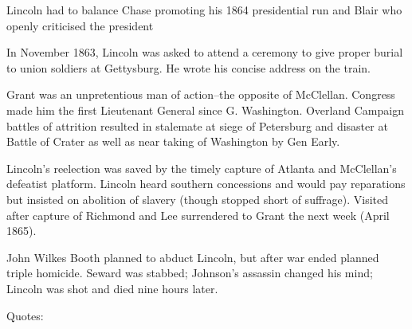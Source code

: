 \documentclass[
]{article}
\begin{document}
Lincoln had to balance Chase promoting his 1864 presidential run and
Blair who openly criticised the president

In November 1863, Lincoln was asked to attend a ceremony to give proper
burial to union soldiers at Gettysburg. He wrote his concise address on
the train.

Grant was an unpretentious man of action--the opposite of McClellan.
Congress made him the first Lieutenant General since G. Washington.
Overland Campaign battles of attrition resulted in stalemate at siege of
Petersburg and disaster at Battle of Crater as well as near taking of
Washington by Gen Early.

Lincoln's reelection was saved by the timely capture of Atlanta and
McClellan's defeatist platform. Lincoln heard southern concessions and
would pay reparations but insisted on abolition of slavery (though
stopped short of suffrage). Visited after capture of Richmond and Lee
surrendered to Grant the next week (April 1865).

John Wilkes Booth planned to abduct Lincoln, but after war ended planned
triple homicide. Seward was stabbed; Johnson's assassin changed his
mind; Lincoln was shot and died nine hours later.

Quotes:
\end{document}
